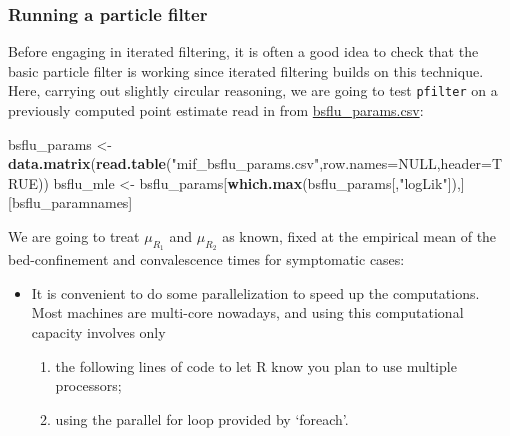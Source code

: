 \documentclass[]{article}
\newenvironment{Shaded}{\begin{snugshade}}{\end{snugshade}}
\newcommand{\KeywordTok}[1]{\textcolor[rgb]{0.13,0.29,0.53}{\textbf{#1}}}
\newcommand{\DataTypeTok}[1]{\textcolor[rgb]{0.13,0.29,0.53}{#1}}
\newcommand{\DecValTok}[1]{\textcolor[rgb]{0.00,0.00,0.81}{#1}}
\newcommand{\StringTok}[1]{\textcolor[rgb]{0.31,0.60,0.02}{#1}}
\newcommand{\OtherTok}[1]{\textcolor[rgb]{0.56,0.35,0.01}{#1}}
\newcommand{\OperatorTok}[1]{\textcolor[rgb]{0.81,0.36,0.00}{\textbf{#1}}}
\newcommand{\NormalTok}[1]{#1}
\begin{document}
\subsubsection{Running a particle
filter}\label{running-a-particle-filter}

Before engaging in iterated filtering, it is often a good idea to check
that the basic particle filter is working since iterated filtering
builds on this technique. Here, carrying out slightly circular
reasoning, we are going to test \texttt{pfilter} on a previously
computed point estimate read in from \url{bsflu_params.csv}:

\begin{Shaded}
\begin{Highlighting}[]
\NormalTok{bsflu_params <-}\StringTok{ }\KeywordTok{data.matrix}\NormalTok{(}\KeywordTok{read.table}\NormalTok{(}\StringTok{"mif_bsflu_params.csv"}\NormalTok{,}\DataTypeTok{row.names=}\OtherTok{NULL}\NormalTok{,}\DataTypeTok{header=}\OtherTok{TRUE}\NormalTok{))}
\NormalTok{bsflu_mle <-}\StringTok{ }\NormalTok{bsflu_params[}\KeywordTok{which.max}\NormalTok{(bsflu_params[,}\StringTok{"logLik"}\NormalTok{]),][bsflu_paramnames]}
\end{Highlighting}
\end{Shaded}

We are going to treat \(\mu_{R_1}\) and \(\mu_{R_2}\) as known, fixed at
the empirical mean of the bed-confinement and convalescence times for
symptomatic cases:

\begin{Shaded}
\end{Shaded}

\begin{itemize}
\item
  It is convenient to do some parallelization to speed up the
  computations. Most machines are multi-core nowadays, and using this
  computational capacity involves only

  \begin{enumerate}
  \def\labelenumi{\arabic{enumi}.}
  \item
    the following lines of code to let R know you plan to use multiple
    processors;
  \item
    using the parallel for loop provided by `foreach'.
  \end{enumerate}
\end{itemize}
\end{document}
